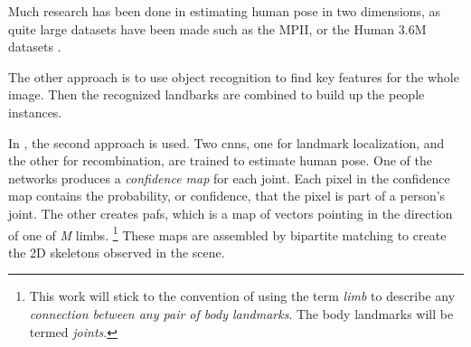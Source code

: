 Much research has been done in estimating human pose in two dimensions, as quite large datasets have been made such as the MPII, or the Human 3.6M datasets \cite{andriluka14cvpr,h36m_pami}.


The other approach is to use object recognition to find key features for the whole image. Then the recognized landbarks are combined to build up the people instances.

In \cite{cao2017realtime}, the second approach is used. Two \gls{cnn}s, one for landmark localization, and the other for recombination, are trained to estimate human pose. One of the networks produces a \emph{confidence map} for each joint. Each pixel in the confidence map contains the probability, or confidence, that the pixel is part of a person's joint. The other creates \gls{paf}s, which is a map of vectors pointing in the direction of one of \emph{M} limbs. \footnote{This work will stick to the convention of using the term \emph{limb} to describe any \emph{connection between any pair of body landmarks}. The body landmarks will be termed \emph{joints}.} These maps are assembled by bipartite matching to create the 2D skeletons observed in the scene.

